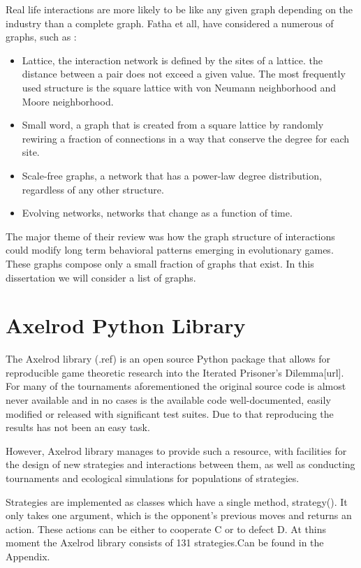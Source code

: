 Real life interactions are more likely to be like any given graph depending on
the industry than a complete graph. Fatha et all, have considered a numerous of graphs,
such as :
\begin{itemize}
  \item Lattice, the interaction network is defined by the sites of a lattice.
   the distance between a pair does not exceed a given value.
   The most frequently used structure is the square lattice with von Neumann
   neighborhood and Moore neighborhood.
  \item Small word, a graph that is created from a square lattice by randomly
   rewiring a fraction of connections in a way that conserve the degree for
   each site.
  \item Scale-free graphs, a network that has a power-law degree distribution, regardless of
   any other structure.
  \item Evolving networks, networks that change as a function of time.
\end{itemize}

The major theme of their review was how the graph structure of interactions could
modify long term behavioral patterns emerging in evolutionary games.
These graphs compose only a small fraction of graphs that exist. In this
dissertation we will consider a list of graphs.

\section{Axelrod Python Library}

The Axelrod library (.ref) is an open source Python package that allows for
reproducible game theoretic research into the Iterated Prisoner's Dilemma[url].
For many of the tournaments aforementioned the original source code is almost never
available and in no cases is the available code well-documented, easily modified
or released with significant test suites. Due to that reproducing the results
has not been an easy task.

However, Axelrod library manages to provide such a resource, with facilities for
the design of new strategies and interactions between them, as well as
conducting tournaments and ecological simulations for populations of strategies.

Strategies are implemented as classes which have a single method, strategy().
It only takes one argument, which is the opponent's previous moves and returns
an action. These actions can be either to cooperate C or to defect D. At thins
moment the Axelrod library consists of 131 strategies.Can be found in the Appendix.

